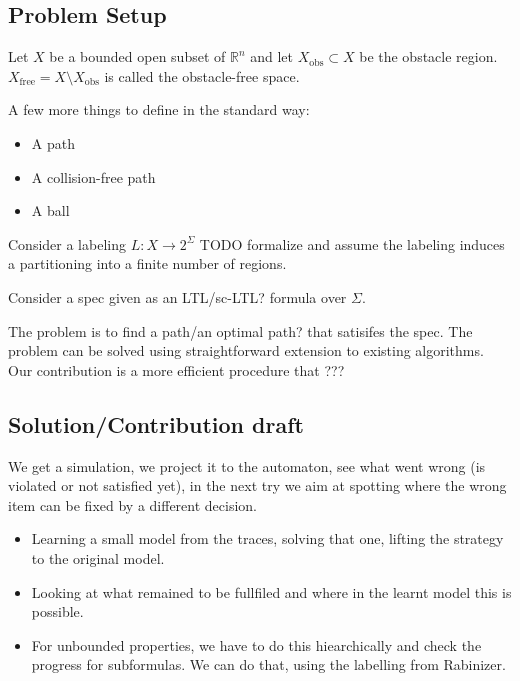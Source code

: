\documentclass{article}
\newcommand{\jana}[1]{{\color{magenta} #1}}
\newcommand{\Real}{\mathbb{R}}
\newcommand{\obs}{\mathrm{obs}}
\newcommand{\free}{\mathrm{free}}
\newcommand{\AP}{\Sigma}
\begin{document}
\subsection{Problem Setup}

Let $X$ be a bounded open subset of $\Real^n$ and let $X_\obs \subset X$ be the obstacle region. $X_\free = X \setminus X_\obs$ is called the obstacle-free space. 

A few more things to define in the standard way:
\begin{itemize}
\item A path
\item A collision-free path
\item A ball
\end{itemize}

Consider a labeling $L: X \rightarrow 2^\AP$ \jana{TODO formalize and assume the labeling induces a partitioning into a finite number of regions}. 

Consider a spec given as an \jana{LTL/sc-LTL?} formula over $\AP$.

The problem is to find \jana{a path/an optimal path?} that satisifes the spec. The problem can be solved using straightforward extension to existing algorithms. \jana{Our contribution is a more efficient procedure that ???}

\subsection{Solution/Contribution draft}

We get a simulation, we project it to the automaton, see what went wrong (is violated or not satisfied yet), in the next try we aim at spotting where the wrong item can be fixed by a different decision.


\begin{itemize}
	\item Learning a small model from the traces, solving that one, lifting the strategy to the original model.
	\item Looking at what remained to be fullfiled and where in the learnt model this is possible.
	\item For unbounded properties, we have to do this hiearchically and check the progress for subformulas. We can do that, using the labelling from Rabinizer.
\end{itemize}
\end{document}
